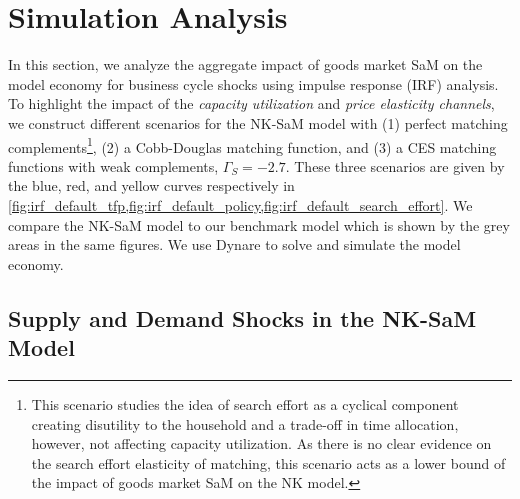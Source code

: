 \documentclass[12pt,3p,authoryear,review]{elsarticle}
\begin{document}
\section{Simulation Analysis}\label{sec:simulations}%
In this section, we analyze the aggregate impact of goods market SaM on the model economy for business cycle shocks using impulse response (IRF) analysis. To highlight the impact of the \emph{capacity utilization} and \emph{price elasticity channels}, we construct different scenarios for the NK-SaM model with (1) perfect matching complements\footnote{This scenario studies the idea of search effort as a cyclical component creating disutility to the household and a trade-off in time allocation, however, not affecting capacity utilization. As there is no clear evidence on the search effort elasticity of matching, this scenario acts as a lower bound of the impact of goods market SaM on the NK model.}, (2) a Cobb-Douglas matching function, and (3) a CES matching functions with weak complements, $\Gamma_S = -2.7$. These three scenarios are given by the blue, red, and yellow curves respectively in \cref{fig:irf_default_tfp,fig:irf_default_policy,fig:irf_default_search_effort}. We compare the NK-SaM model to our benchmark model which is shown by the grey areas in the same figures. We use Dynare \citep{adjemian2024dynare} to solve and simulate the model economy.%
\subsection{Supply and Demand Shocks in the NK-SaM Model}%
\end{document}

